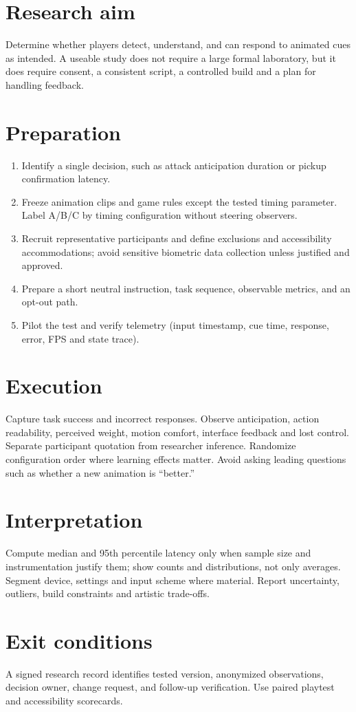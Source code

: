\documentclass[10pt,letterpaper]{article}
\begin{document}
\makedoctitle
\makedocsummary
\tableofcontents\clearpage

\section{Research aim}
Determine whether players detect, understand, and can respond to animated cues as intended. A useable study does not require a large formal laboratory, but it does require consent, a consistent script, a controlled build and a plan for handling feedback.
\section{Preparation}
\begin{enumerate}
\item Identify a single decision, such as attack anticipation duration or pickup confirmation latency.
\item Freeze animation clips and game rules except the tested timing parameter. Label A/B/C by timing configuration without steering observers.
\item Recruit representative participants and define exclusions and accessibility accommodations; avoid sensitive biometric data collection unless justified and approved.
\item Prepare a short neutral instruction, task sequence, observable metrics, and an opt-out path.
\item Pilot the test and verify telemetry (input timestamp, cue time, response, error, FPS and state trace).
\end{enumerate}
\section{Execution}
Capture task success and incorrect responses. Observe anticipation, action readability, perceived weight, motion comfort, interface feedback and lost control. Separate participant quotation from researcher inference. Randomize configuration order where learning effects matter. Avoid asking leading questions such as whether a new animation is ``better.''
\section{Interpretation}
Compute median and 95th percentile latency only when sample size and instrumentation justify them; show counts and distributions, not only averages. Segment device, settings and input scheme where material. Report uncertainty, outliers, build constraints and artistic trade-offs.
\section{Exit conditions}
A signed research record identifies tested version, anonymized observations, decision owner, change request, and follow-up verification. Use paired playtest and accessibility scorecards.
\end{document}
